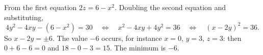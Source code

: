 From the first equation $2z=6-x^2$. Doubling the second equation and substituting,
\[
4y^2-4xy-(6-x^2)=30\quad\Longleftrightarrow\quad x^2-4xy+4y^2=36\quad\Longleftrightarrow\quad(x-2y)^2=36 .
\]
So $x-2y=\pm6$. The value $-6$ occurs, for instance $x=0$, $y=3$, $z=3$: then $0+6-6=0$ and $18-0-3=15$. The minimum is $\boxed{-6}$.
